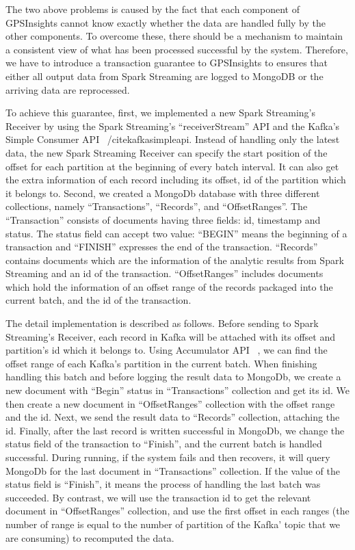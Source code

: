 \documentclass{acm_proc_article-sp}
\begin{document}
The two above problems is caused by the fact that each component of GPSInsights cannot know exactly whether the data are handled fully by the other components. To overcome these, there should be a mechanism to maintain a consistent view of what has been processed successful by the system. Therefore, we have to introduce a transaction guarantee to GPSInsights to ensures that either all output data from Spark Streaming are logged to MongoDB or the arriving data are reprocessed.

To achieve this guarantee, first, we implemented a new Spark Streaming's Receiver by using the Spark Streaming's ``receiverStream'' API and the Kafka's Simple Consumer API ~/cite{kafkasimpleapi}. Instead of handling only the latest data, the new Spark Streaming Receiver can specify the start position of the offset for each partition at the beginning of every batch interval. It can also get the extra information of each record including its offset, id of the partition which it belongs to. Second, we created a MongoDb database with three different collections, namely ``Transactions'', ``Records'', and ``OffsetRanges''. The ``Transaction'' consists of documents having three fields: id, timestamp and status. The status field can accept two value: ``BEGIN'' means the beginning of a transaction and ``FINISH'' expresses the end of the transaction. ``Records'' contains documents which are the information of the analytic results from Spark Streaming and an id of the transaction. ``OffsetRanges'' includes documents which hold the information of an offset range of the records packaged into the current batch, and the id of the transaction.

The detail implementation is described as follows. Before sending to Spark Streaming's Receiver, each record in Kafka will be attached with its offset and partition's id which it belongs to. Using Accumulator API ~\cite{accumulatorapi}, we can find the offset range of each Kafka's partition in the current batch. When finishing handling this batch and before logging the result data to MongoDb, we create a new document with ``Begin'' status in ``Transactions'' collection and get its id. We then create a new document in ``OffsetRanges'' collection with the offset range and the id. Next, we send the result data to ``Records'' collection, attaching the id. Finally, after the last record is written successful in MongoDb, we change the status field of the transaction to ``Finish'', and the current batch is handled successful. During running, if the system fails and then recovers, it will query MongoDb for the last document in ``Transactions'' collection.  If the value of the status field is ``Finish'', it means the process of handling the last batch was succeeded. By contrast, we will use the transaction id to get the relevant document in ``OffsetRanges'' collection, and use the first offset in each ranges (the number of range is equal to the number of partition of the Kafka' topic that we are consuming) to recomputed the data. 
\end{document}
